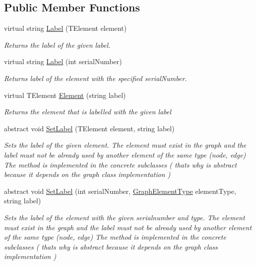 \subsection*{Public Member Functions}
\begin{DoxyCompactItemize}
\item 
virtual string \hyperlink{class_graph_library_1_1_generics_1_1_abstract_graph_labeling_ac9f80d3d85c1b5e0eb693bac9200e8ad}{Label} (T\+Element element)
\begin{DoxyCompactList}\small\item\em Returns the label of the given label. \end{DoxyCompactList}\item 
virtual string \hyperlink{class_graph_library_1_1_generics_1_1_abstract_graph_labeling_a1b94ec7d484a23a72a70ecc49f8058d4}{Label} (int serial\+Number)
\begin{DoxyCompactList}\small\item\em Returns label of the element with the specified serial\+Number. \end{DoxyCompactList}\item 
virtual T\+Element \hyperlink{class_graph_library_1_1_generics_1_1_abstract_graph_labeling_a3edd901c67ddc1ffbb54e0e35eb507dd}{Element} (string label)
\begin{DoxyCompactList}\small\item\em Returns the element that is labelled with the given label \end{DoxyCompactList}\item 
abstract void \hyperlink{class_graph_library_1_1_generics_1_1_abstract_graph_labeling_ad80b09ba50c168a12de02fd7936374ee}{Set\+Label} (T\+Element element, string label)
\begin{DoxyCompactList}\small\item\em Sets the label of the given element. The element must exist in the graph and the label must not be already used by another element of the same type (node, edge) The method is implemented in the concrete subclasses ( thats why is abstract because it depends on the graph class implementation ) \end{DoxyCompactList}\item 
abstract void \hyperlink{class_graph_library_1_1_generics_1_1_abstract_graph_labeling_a268a30e52ddd582947c6e35766627e73}{Set\+Label} (int serial\+Number, \hyperlink{namespace_graph_library_1_1_generics_a919a165f16deccdd1b3d7e8a93423fbc}{Graph\+Element\+Type} element\+Type, string label)
\begin{DoxyCompactList}\small\item\em Sets the label of the element with the given serialnumber and type. The element must exist in the graph and the label must not be already used by another element of the same type (node, edge) The method is implemented in the concrete subclasses ( thats why is abstract because it depends on the graph class implementation ) \end{DoxyCompactList}\end{DoxyCompactItemize}
